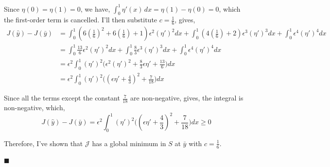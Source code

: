 \documentclass[12pt]{article}
\begin{document}
Since $\eta(0)=\eta(1)=0$, we have, $\int_0^1\eta'(x)\,dx=\eta(1)-\eta(0)=0$, which the first-order term is cancelled. I'll then substitute $c=\frac{1}{6}$, gives, 
\begin{align*}
	J(\hat y) - J(\bar y) &= \int_0^1 (6(\frac{1}{6})^2+6(\frac{1}{6})+1)\epsilon^2 (\eta')^2 dx + \int_0^1 (4(\frac{1}{6})+2)\epsilon^3 (\eta')^3 dx + \int_0^1 \epsilon^4 (\eta')^4 dx \\
	&= \int_0^1 \frac{13}{6}\epsilon^2 (\eta')^2 dx + \int_0^1 \frac{8}{3}\epsilon^3 (\eta')^3 dx + \int_0^1 \epsilon^4 (\eta')^4 dx \\
	&= \epsilon^2 \int_0^1 (\eta')^2 \Big( \epsilon^2 (\eta')^2 + \frac{8}{3}\epsilon \eta' + \frac{13}{6} \Big) dx \\
	&= \epsilon^2 \int_0^1 (\eta')^2 \Big( (\epsilon \eta' + \frac{4}{3})^2 + \frac{7}{18} \Big) dx
\end{align*}

Since all the terms except the constant $\frac{7}{18}$ are non-negative, gives, the integral is non-negative, which, 
$$J(\hat y) - J(\bar y) = \epsilon^2 \int_0^1 (\eta')^2 \Big( (\epsilon \eta' + \frac{4}{3})^2 + \frac{7}{18} \Big) dx \ge 0$$

Therefore, I've shown that $\mathcal J$ has a global minimum in $S$ at $\bar y$ with $c = \frac{1}{6}$.

\hfill $\blacksquare$




\end{document}
